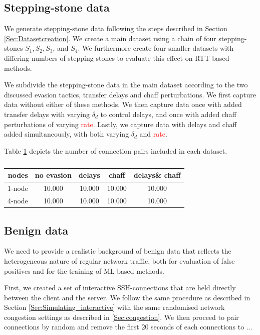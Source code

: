 \documentclass[runningheads]{llncs}\usepackage[]{graphicx}\usepackage[]{color}
\begin{document}
\subsection{Stepping-stone data}

We generate stepping-stone data following the steps described in Section \ref{Sec:Datasetcreation}. We create a main dataset using a chain of four stepping-stones $S_1, S_2, S_3$, and $S_4$. We furthermore create four smaller datasets with differing numbers of stepping-stones to evaluate this effect on RTT-based methods.

We subdivide the stepping-stone data in the main dataset according to the two discussed evasion tactics, transfer delays and chaff perturbations. We first capture data without either of these methods. We then capture data once with added transfer delays with varying $\delta_d$ to control delays, and once with added chaff perturbations of varying \textcolor{red}{rate}. Lastly, we capture data with delays and chaff added simultaneously, with both varying $\delta_d$ and \textcolor{red}{rate}.


Table \ref{Tab:Stepstone_data} depicts the number of connection pairs included in each dataset.

\begin{table}
\centering
\begin{tabular}{r|c|c|c|c}
nodes & no evasion & delays & chaff & delays\& chaff  \\
\hline
1-node & 10.000 & 10.000 & 10.000 & 10.000 \\
4-node & 10.000 & 10.000 & 10.000 & 10.000 \\
\end{tabular}
\caption{}\label{Tab:Stepstone_data}
\end{table}

 
\subsection{Benign data}

We need to provide a realistic background of benign data that reflects the heterogeneous nature of regular network traffic, both for evaluation of false positives and for the training of ML-based methods.

First, we created a set of interactive SSH-connections that are held directly between the client and the server. We follow the same procedure as described in Section \ref{Sec:Simulating_interactive} with the same randomised network congestion settings as described in \ref{Sec:congestion}. We then proceed to pair connections by random and remove the first 20 seconds of each connections to ...
\end{document}
